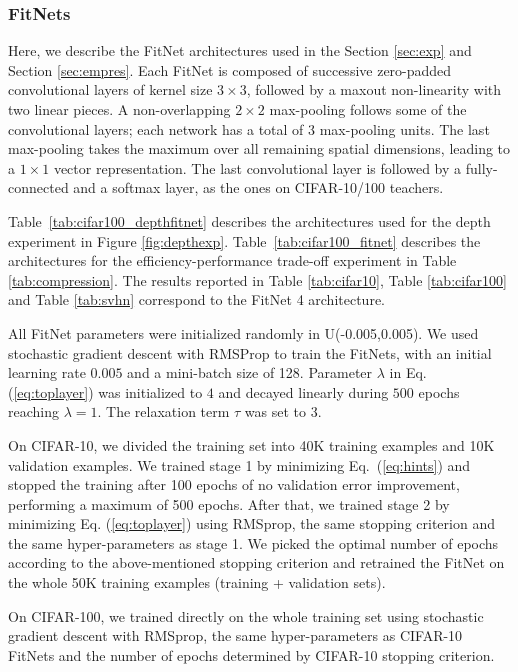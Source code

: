 \documentclass{article} %
\begin{document}
\subsubsection{FitNets}

Here, we describe the FitNet architectures used in the Section \ref{sec:exp} and Section \ref{sec:empres}. Each FitNet is composed of successive zero-padded convolutional layers of
kernel size $3 \times 3$, followed by a maxout non-linearity with two linear
pieces. A non-overlapping $2 \times 2$ max-pooling follows some
of the convolutional layers; each network has a total of 3 max-pooling units. The last max-pooling takes the maximum over all remaining spatial dimensions, leading to a $1 \times 1$ vector representation. The last convolutional layer is followed by a fully-connected and a softmax layer, as the ones on CIFAR-10/100 teachers.

Table~\ref{tab:cifar100_depthfitnet} describes the architectures used for the
depth experiment in Figure \ref{fig:depthexp}. Table~\ref{tab:cifar100_fitnet} describes the architectures for the efficiency-performance trade-off experiment in Table \ref{tab:compression}. The results reported in Table \ref{tab:cifar10}, Table \ref{tab:cifar100} and Table \ref{tab:svhn} correspond to the FitNet 4 architecture.

All FitNet parameters were initialized randomly in U(-0.005,0.005). We used stochastic gradient descent with RMSProp \citep{Tieleman12} to train the FitNets, with an initial
learning rate $0.005$ and a mini-batch size of 128. Parameter $\lambda$ in Eq. (\ref{eq:toplayer})
was initialized to $4$ and decayed linearly during $500$ epochs reaching $\lambda = 1$. The relaxation term $\tau$ was set to 3.

On CIFAR-10, we divided the training set into 40K training examples and
10K validation examples. We trained stage 1 by minimizing Eq.~(\ref{eq:hints})
and stopped the training after 100 epochs of no validation error improvement, performing a maximum of 500 epochs.  After that, we trained stage 2 by minimizing Eq. (\ref{eq:toplayer}) using RMSprop, the same stopping criterion and the same hyper-parameters as stage 1. We picked the optimal number of epochs according to the above-mentioned stopping criterion and retrained the FitNet on the
whole 50K training examples (training + validation sets).  

On CIFAR-100, we trained directly on the whole training set using stochastic gradient descent with RMSprop, the same hyper-parameters as CIFAR-10 FitNets and the number of epochs determined by CIFAR-10 stopping criterion.
\end{document}
